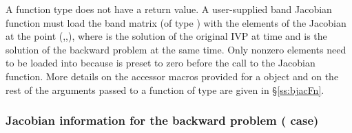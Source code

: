{
  A  function type does not have a return value.                        
}
{
  A user-supplied band Jacobian function must load the band matrix 
  (of type ) with the elements of the Jacobian at the
  point (,,), where  is the solution
  of the original IVP at time  and  is the solution of the
  backward problem at the same time.  
  Only nonzero elements need to be loaded into
   because  is preset to zero before the call to the
  Jacobian function. More details on the accessor macros provided for
  a  object and on the rest of the arguments passed to a function
  of type  are given in \S\ref{ss:bjacFn}.
}

\subsubsection{Jacobian information for the backward problem
  ({\spgmr} case)}


